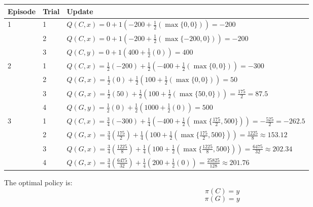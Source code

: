 \documentclass[12pt]{article}
\begin{document}
\begin{enumerate}
  \begin{center}
    \begin{tabular}{lll} \hline
      \textbf{Episode} & \textbf{Trial} & \textbf{Update} \\ \hline
      1 & 1 & $Q(C,x) = 0 + 1(-200 + \frac{1}{2}(\max\{0, 0\})) = -200$ \\ 
      & 2 & $Q(C,x) = 0 + 1(-200 + \frac{1}{2}(\max\{-200, 0\})) = -200$ \\
      & 3 & $Q(C,y) = 0 + 1(400 + \frac{1}{2}(0)) = 400$ \\ \hline
      2 & 1 & $Q(C,x) = \frac{1}{2}(-200) + \frac{1}{2}(-400 + \frac{1}{2}(\max\{0, 0\})) = -300$ \\ 
      & 2 & $Q(G,x) = \frac{1}{2}(0) + \frac{1}{2}(100 + \frac{1}{2}(\max\{0, 0\})) = 50$ \\ 
      & 3 & $Q(G,x) = \frac{1}{2}(50) + \frac{1}{2}(100 + \frac{1}{2}(\max\{50, 0\})) = \frac{175}{2} = 87.5$ \\ 
      & 4 & $Q(G,y) = \frac{1}{2}(0) + \frac{1}{2}(1000 + \frac{1}{2}(0)) = 500$ \\ \hline
      3 & 1 & $Q(C,x) = \frac{3}{4}(-300) + \frac{1}{4}(-400 + \frac{1}{2}(\max\{\frac{175}{2}, 500\})) = -\frac{525}{2} = -262.5$ \\ 
      & 2 & $Q(G,x) = \frac{3}{4}(\frac{175}{2}) + \frac{1}{4}(100 + \frac{1}{2}(\max\{\frac{175}{2}, 500\})) = \frac{1225}{8} \approx 153.12$ \\ 
      & 3 & $Q(G,x) = \frac{3}{4}(\frac{1225}{8}) + \frac{1}{4}(100 + \frac{1}{2}(\max\{\frac{1225}{8}, 500\})) = \frac{6475}{32} \approx 202.34$ \\ 
      & 4 & $Q(G,x) = \frac{3}{4}(\frac{6475}{32}) + \frac{1}{4}(200 + \frac{1}{2}(0)) = \frac{25825}{128} \approx 201.76$ \\ 
    \end{tabular}
  \end{center}

  The optimal policy is:
  \[
    \pi(C) = y
  \]
  \[
    \pi(G) = y
  \]

  \end{enumerate}
\end{document}
